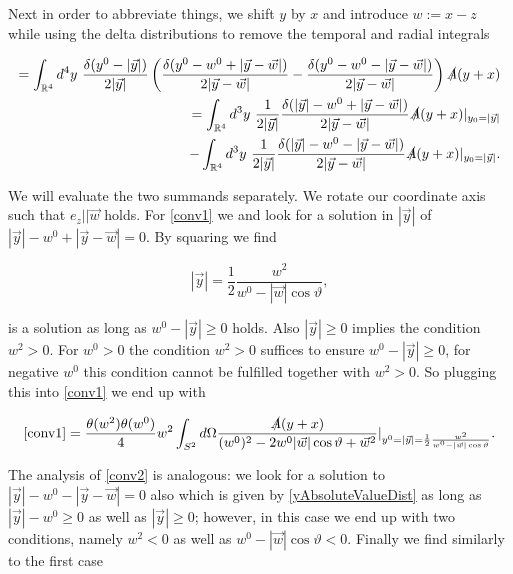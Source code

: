 \documentclass[a4paper,11pt]{article}
\begin{document}
Next in order to abbreviate things, we shift \(y\) by \(x\) and introduce \(w:= x-z\) while using the delta distributions to remove the
temporal and radial integrals

\begin{align}
=\int_{\mathbb{R}^4} d^4 y~
 \frac{\delta(y^0 - |\vec{y}|)}{2|\vec{y}|}
\left( \frac{\delta(y^0-w^0 + |\vec{y}-\vec{w}|)}{2|\vec{y}-\vec{w}|} - \frac{\delta(y^0-w^0 - |\vec{y}-\vec{w}|)}{2|\vec{y}-\vec{w}|} \right)
\slashed{A}(y+x) \\
=\int_{\mathbb{R}^4} d^3 y~\label{conv1}
 \frac{1}{2|\vec{y}|}
 \frac{\delta(|\vec{y}| -w^0 + |\vec{y}-\vec{w}|)}{2|\vec{y}-\vec{w}|}\slashed{A}(y+x)|_{y_0=|\vec{y}|}\\
-\int_{\mathbb{R}^4} d^3 y~\label{conv2}
 \frac{1}{2|\vec{y}|}
\frac{\delta(|\vec{y}|-w^0 - |\vec{y}-\vec{w}|)}{2|\vec{y}-\vec{w}|}
\slashed{A}(y+x)|_{y_0=|\vec{y}|}.
\end{align}

We will evaluate the two summands separately. We rotate our coordinate axis such that \(e_z || \vec{w}\) holds. For \eqref{conv1} we
 and look for a solution in \(|\vec{y}|\) of \(|\vec{y}| - w^0 + |\vec{y}-\vec{w}|=0\). By squaring we find

\begin{equation}\label{yAbsoluteValueDist}
|\vec{y}|= \frac{1}{2} \frac{w^2}{w^0 - |\vec{w}| \cos\vartheta},
\end{equation}

is a solution as long as \(w^0-|\vec{y}| \ge 0\) holds. Also \(|\vec{y}|\ge 0\) implies the condition \(w^2>0\). For \(w^0>0\) the condition
\(w^2>0\) suffices to ensure \(w^0-|\vec{y}| \ge 0\), for negative \(w^0\) this condition cannot be fulfilled together with \(w^2>0\).
So plugging this into \eqref{conv1} we end up with

\begin{align}\label{d'*d'1}
\eqref{conv1}= \frac{\theta(w^2) \theta(w^0)}{4} w^2 \int_{S^2} d \Omega \frac{\slashed{A}(y+x)}{(w^0)^2 - 2 w^0 |\vec{w}| \cos\vartheta + \vec{w}^2}|_{y^0=|\vec{y}|=\frac{1}{2}\frac{w^2}{w^0-|\vec{w}|\cos\vartheta}}.
\end{align}

The analysis of \eqref{conv2} is analogous: we look for a solution to \(|\vec{y}|-w^0-|\vec{y}-\vec{w}|=0\) 
also which is given by \eqref{yAbsoluteValueDist}
as long as \(|\vec{y}|-w^0\ge0\) as well as \(|\vec{y}|\ge0\); however, in this case we end up with two conditions, namely \(w^2<0 \) 
as well as \(w^0-|\vec{w}|\cos\vartheta <0\). Finally we find similarly to the first case 
\end{document}
